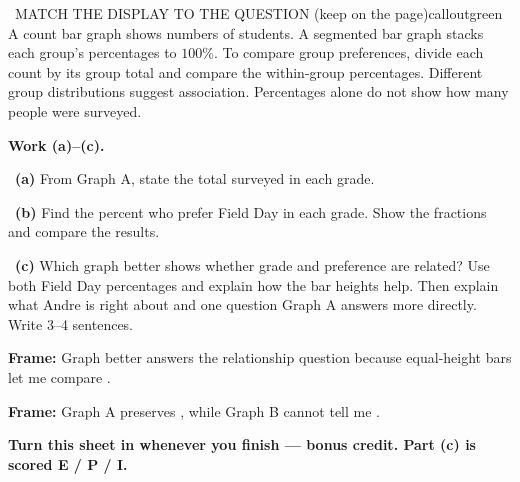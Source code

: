 \documentclass[11pt]{article}
\begin{document}
\begin{callout}{\IconBook\ MATCH THE DISPLAY TO THE QUESTION (keep on the page)}{calloutgreen}
A count bar graph shows numbers of students. A segmented bar graph stacks each group's percentages to $100\%$. To compare group preferences, divide each count by its group total and compare the within-group percentages. Different group distributions suggest association. Percentages alone do not show how many people were surveyed.
\end{callout}

\newpage
\textbf{Work (a)--(c).}\par\smallskip

~\textbf{(a)} From Graph A, state the total surveyed in each grade.\par
\workspace{0.7in}

~\textbf{(b)} Find the percent who prefer Field Day in each grade. Show the fractions and compare the results.\par
\workspace{1.4in}

~\textbf{(c)} Which graph better shows whether grade and preference are related? Use both Field Day percentages and explain how the bar heights help. Then explain what Andre is right about and one question Graph A answers more directly. Write 3--4 sentences.\par
\workspace{2.0in}

\begin{sentenceframebox}\raggedright\textbf{Frame:} Graph \blank[0.4in] better answers the relationship question because equal-height bars let me compare \blank[2.2in].\end{sentenceframebox}

\begin{sentenceframebox}\raggedright\textbf{Frame:} Graph A preserves \blank[1.2in], while Graph B cannot tell me \blank[2.0in].\end{sentenceframebox}

\textbf{Turn this sheet in whenever you finish --- bonus credit. Part (c) is scored E / P / I.}\par
\end{document}
